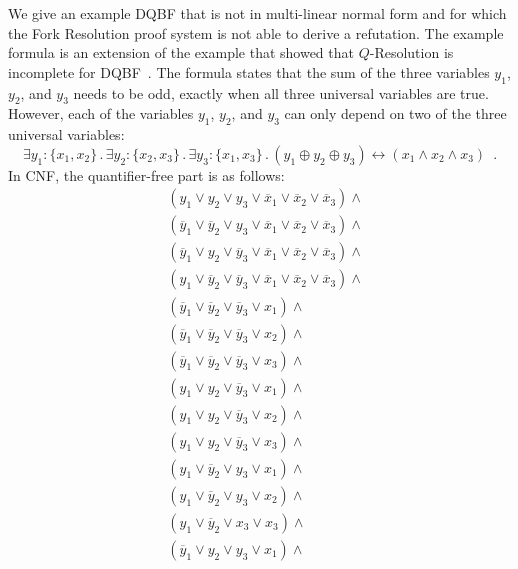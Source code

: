 \documentclass{svjour3}
\newcommand{\ldot}{\mathpunct{.}}
\newcommand{\set}[1]{{\{#1\}}}
\begin{document}
\begin{example}
We give an example DQBF that is not in multi-linear normal form and for which the Fork Resolution proof system is not able to derive a refutation.
The example formula is an extension of the example that showed that $Q$-Resolution is incomplete for DQBF~\cite{BalabanovChiangJiang/2014/ACertificationPerspectiveOfDQBF}. 
The formula states that the sum of the three variables $y_1$, $y_2$, and $y_3$ needs to be odd, exactly when all three universal variables are true.
However, each of the variables $y_1$, $y_2$, and $y_3$ can only depend on two of the three universal variables:
\begin{equation*}
  \exists y_1: \set{x_1, x_2} \ldot
  \exists y_2: \set{x_2, x_3} \ldot
  \exists y_3: \set{x_1, x_3} \ldot
  (y_1 \oplus y_2 \oplus y_3) \leftrightarrow (x_1 \land x_2 \land x_3) \enspace.
\end{equation*}
In CNF, the quantifier-free part is as follows:
{%
\begin{align*}
&(y_1 \lor y_2 \lor y_3 \lor \overline x_1 \lor \overline x_2 \lor \overline x_3) \land\\
&(\overline y_1 \lor \overline y_2 \lor y_3 \lor \overline x_1 \lor \overline x_2 \lor \overline x_3) \land\\
&(\overline y_1 \lor y_2 \lor \overline y_3 \lor \overline x_1 \lor \overline x_2 \lor \overline x_3) \land\\
&(y_1 \lor \overline y_2 \lor \overline y_3 \lor \overline x_1 \lor \overline x_2 \lor \overline x_3) \land\\
&(\overline y_1 \lor \overline y_2 \lor \overline y_3 \lor x_1) \land\\
&(\overline y_1 \lor \overline y_2 \lor \overline y_3 \lor x_2) \land\\
&(\overline y_1 \lor \overline y_2 \lor \overline y_3 \lor x_3) \land\\
&(y_1 \lor y_2 \lor \overline y_3 \lor x_1) \land\\
&(y_1 \lor y_2 \lor \overline y_3 \lor x_2) \land\\
&(y_1 \lor y_2 \lor \overline y_3 \lor x_3) \land\\
&(y_1 \lor \overline y_2 \lor y_3 \lor x_1) \land\\
&(y_1 \lor \overline y_2 \lor y_3 \lor x_2) \land\\
&(y_1 \lor \overline y_2 \lor x_3 \lor x_3) \land\\
&(\overline y_1 \lor y_2 \lor y_3 \lor x_1) \land\\

\end{align*}}
\end{example}
\end{document}
